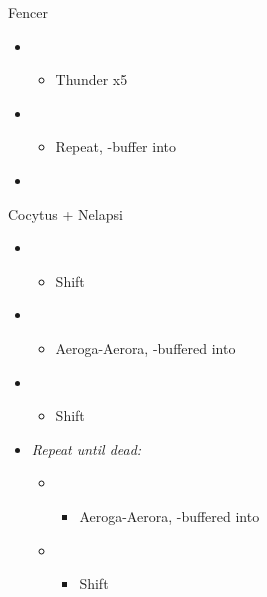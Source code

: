 \begin{battle}{Fencer}
	\begin{itemize}
		\item \sixth
		      \begin{itemize}
			      \item Thunder x5
		      \end{itemize}
		\item \fifth
		      \begin{itemize}
			      \item Repeat, \com-buffer into
		      \end{itemize}
		\item \first
	\end{itemize}
\end{battle}
\begin{battle}{Cocytus + Nelapsi}
	\begin{flushleft}
		\begin{itemize}
			\item \sixth
			      \begin{itemize}
				      \item Shift
			      \end{itemize}
			\item \second
			      \begin{itemize}
				      \item Aeroga-Aerora, \com-buffered into
			      \end{itemize}
			\item \first
			      \begin{itemize}
				      \item Shift
			      \end{itemize}
			\item \textit{Repeat until dead:}
			      \begin{itemize}
				      \item \sixth
				            \begin{itemize}
					            \item Aeroga-Aerora, \com-buffered into
				            \end{itemize}
				      \item \first
				            \begin{itemize}
					            \item Shift
				            \end{itemize}
			      \end{itemize}
		\end{itemize}
	\end{flushleft}
\end{battle}

